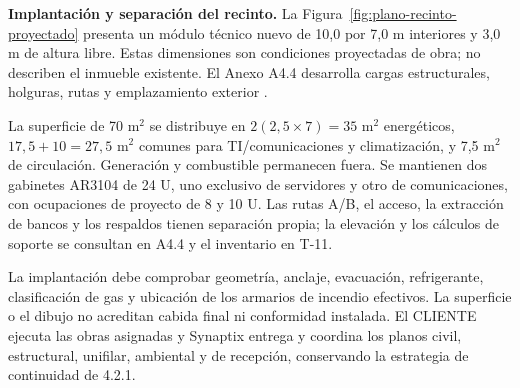\textbf{Implantación y separación del recinto.}
La Figura~\ref{fig:plano-recinto-proyectado} presenta un módulo técnico nuevo de 10,0 por 7,0 m interiores y 3,0 m de altura libre. Estas dimensiones son condiciones proyectadas de obra; no describen el inmueble existente. El Anexo A4.4 desarrolla cargas estructurales, holguras, rutas y emplazamiento exterior \parencite[RT-06.01/03/06, pp.~14--15]{pucv-transversal}.



La superficie de 70 m$^2$ se distribuye en $2(2,5\times7)=35$ m$^2$ energéticos, $17,5+10=27,5$ m$^2$ comunes para TI/comunicaciones y climatización, y 7,5 m$^2$ de circulación. Generación y combustible permanecen fuera. Se mantienen dos gabinetes AR3104 de 24 U, uno exclusivo de servidores y otro de comunicaciones, con ocupaciones de proyecto de 8 y 10 U. Las rutas A/B, el acceso, la extracción de bancos y los respaldos tienen separación propia; la elevación y los cálculos de soporte se consultan en A4.4 y el inventario en T-11.

La implantación debe comprobar geometría, anclaje, evacuación, refrigerante, clasificación de gas y ubicación de los armarios de incendio efectivos. La superficie o el dibujo no acreditan cabida final ni conformidad instalada. El CLIENTE ejecuta las obras asignadas y Synaptix entrega y coordina los planos civil, estructural, unifilar, ambiental y de recepción, conservando la estrategia de continuidad de 4.2.1.

